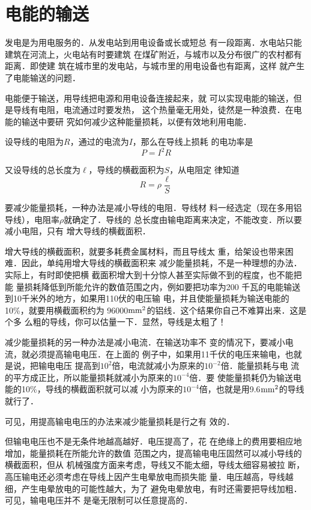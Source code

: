 \section{电能的输送}
发电是为用电服务的．从发电站到用电设备或长或短总
有一段距离．水电站只能建筑在河流上，火电站有时要建筑
在煤矿附近，与城市以及分布很广的农村都有距离．即使建
筑在城市里的发电站，与城市里的用电设备也有距离，这样
就产生了电能输送的问题．

电能便于输送，用导线把电源和用电设备连接起来，就
可以实现电能的输送，但是导线有电阻，电流通过时要发热，
这个热量毫无用处，徒然是一种浪费．在电能的输送中要研
究如何减少这种能量损耗，以便有效地利用电能．

设导线的电阻为$R$，通过的电流为$I$，那么在导线上损耗
的电功率是
\[P=I^2R \]

又设导线的总长度为$\ell$，导线的横截面积为$S$，从电阻定
律知道
\[ R=\rho\frac{\ell}{S}\]

要减少能量损耗，一种办法是减小导线的电阻．导线材
料一经选定（现在多用铝导线），电阻率$\rho$就确定了．导线的
总长度由输电距离来决定，不能改变．所以要减小电阻，只有
增大导线的横截面积．

增大导线的横截面积，就要多耗费金属材料，而且导线太
重，给架设也带来困难．因此，单纯用增大导线的横截面积来
减少能量损耗，不是一种理想的办法．实际上，有时即使把横
截面积增大到十分惊人甚至实际做不到的程度，也不能把能
量损耗降低到所能允许的数值范围之内，例如要把功率为200
千瓦的电能输送到10千米外的地方，如果用110伏的电压输
电，并且使能量损耗为输送电能的10\%，就要用横截面积约为
96000${\rm mm}^2$的铝线．这个结果你自己不难算出来．这是个多
么粗的导线，你可以估量一下．显然，导线是太粗了！

减少能量损耗的另一种办法是减小电流．在输送功率不
变的情况下，要减小电流，就必须提高输电电压．在上面的
例子中，如果用11千伏的电压来输电，也就是说，把输电电压
提高到$10^2$倍，电流就减小为原来的$10^{-2}$倍．能量损耗与电
流的平方成正比，所以能量损耗就减小为原来的$10^{-4}$倍．要
使能量损耗仍为输送电能的10\%，导线的横截面积就可以减
小为原来的$10^{-4}$倍，也就是用9.6${\rm mm}^2$的导线就行了．

可见，用提高输电电压的办法来减少能量损耗是行之有
效的．

但输电电压也不是无条件地越高越好．电压提高了，花
在绝缘上的费用要相应地增加，能量损耗在所能允许的数值
范围之内，提高输电电压固然可以减小导线的横截面积，但从
机械强度方面来考虑，导线又不能太细，导线太细容易被拉
断，高压输电还必须考虑在导线上因产生电晕放电而损失能
量．电压越高，导线越细，产生电晕放电的可能性越大，为了
避免电晕放电，有时还需要把导线加粗．可见，输电电压并不
是毫无限制可以任意提高的．

